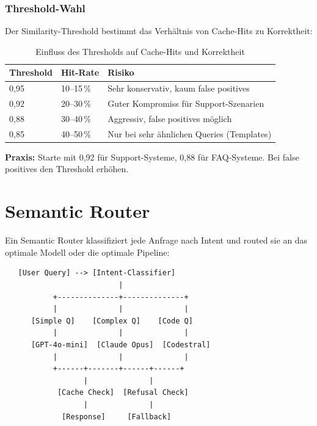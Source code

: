 \subsubsection{Threshold-Wahl}

Der Similarity-Threshold bestimmt das Verhältnis von Cache-Hits zu Korrektheit:

\begin{table}[H]
\centering
\begin{tabularx}{\linewidth}{lXX}
\toprule
\textbf{Threshold} & \textbf{Hit-Rate} & \textbf{Risiko} \\
\midrule
0,95 & 10--15\,\% & Sehr konservativ, kaum false positives \\
0,92 & 20--30\,\% & Guter Kompromiss für Support-Szenarien \\
0,88 & 30--40\,\% & Aggressiv, false positives möglich \\
0,85 & 40--50\,\% & Nur bei sehr ähnlichen Queries (Templates) \\
\bottomrule
\end{tabularx}
\caption{Einfluss des Thresholds auf Cache-Hits und Korrektheit}
\label{tab:threshold}
\end{table}

\textbf{Praxis:} Starte mit 0,92 für Support-Systeme, 0,88 für FAQ-Systeme. Bei false positives den Threshold erhöhen.


\section{Semantic Router}

Ein Semantic Router klassifiziert jede Anfrage nach Intent und routed sie an das optimale Modell oder die optimale Pipeline:

\begin{verbatim}
   [User Query] --> [Intent-Classifier]
                          |
           +--------------+--------------+
           |              |              |
      [Simple Q]    [Complex Q]    [Code Q]
           |              |              |
      [GPT-4o-mini]  [Claude Opus]  [Codestral]
           |              |              |
           +------+-------+------+------+
                  |              |
            [Cache Check]  [Refusal Check]
                  |              |
             [Response]     [Fallback]
\end{verbatim}

